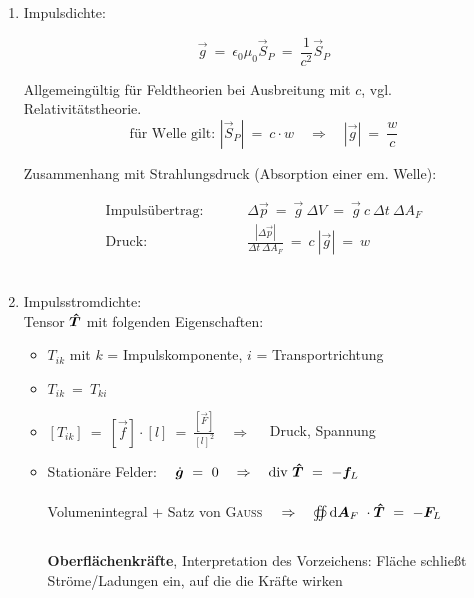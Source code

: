 \begin{enumerate}[label = \roman*)]
	\item Impulsdichte:\
	
	\begin{equation*}
	\vec{g} \ = \ \epsilon_0\mu_0 \vec{S}_P \ = \ \frac{1}{c^2}\vec{S}_P
	\end{equation*} 
	
	Allgemeingültig für Feldtheorien bei Ausbreitung mit $c$, vgl. Relativitätstheorie.
	\begin{equation*}
	\text{für Welle gilt: } |\vec{S}_P| \ = \ c \cdot w \quad \Rightarrow \quad |\vec{g}| \ = \ \frac{w}{c} 
	\end{equation*}
	
	Zusammenhang mit Strahlungsdruck (Absorption einer em. Welle): 
	
	\begin{align*}
	\text{Impulsübertrag:  } \qquad & \Delta \vec{p} \ = \ \vec{g} \ \Delta V \ = \ \vec{g} \ c \ \Delta t \ \Delta A_F\\
	\text{Druck: } \qquad & \frac{|\Delta\vec{p}|}{\Delta t \ \Delta A_F} \ = \ c \ |\vec{g}| \ = \ w
	\end{align*}
	\ \\
	
	\item Impulsstromdichte: \\
	
	Tensor $\bm{\hat{T}}$ mit folgenden Eigenschaften:
	
	\begin{itemize}
		\item $T_{ik}$ mit $k$ = Impulskomponente, $i$ = Transportrichtung
		\item $T_{ik} \ = \ T_{ki}$
		\item $ [T_{ik}] \ = \ [\vec{f}] \cdot [l] \ = \ \frac{[\vec{F}]}{[l]^2} \quad \Rightarrow \quad$ Druck, Spannung
		\item Stationäre Felder: $\quad \dot{\vec{g}} \ = \ 0 \quad \Rightarrow \quad \div \tens{T} \ = \ -\vec{f}_L$\\
		\ \\
		Volumenintegral + Satz von \textsc{Gauss} $ \quad \Rightarrow \quad \oiint\limits_{{}}^{{}}\mathrm{d}{\bm{A}_F}\  \cdot \bm{\hat{T}} \ = \ - \bm{F}_L \quad$\\
		\ \\
		\textbf{Oberflächenkräfte}, Interpretation des Vorzeichens: Fläche schließt Ströme/Ladungen ein, auf die die Kräfte wirken
	\end{itemize}
\end{enumerate}

